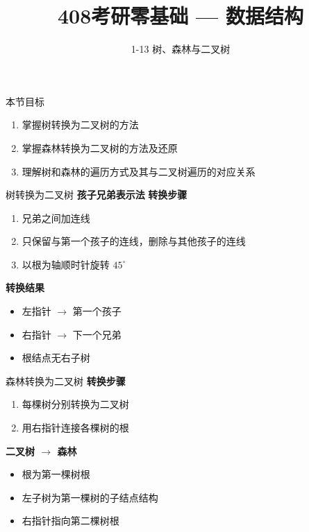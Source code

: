 \documentclass[10pt, aspectratio=169]{beamer}
\title{408考研零基础 --- 数据结构}
\subtitle{1-13 树、森林与二叉树}
\author{}
\date{}
\begin{document}
\begin{frame}{本节目标}
    \begin{enumerate}
        \item 掌握树转换为二叉树的方法
        \item 掌握森林转换为二叉树的方法及还原
        \item 理解树和森林的遍历方式及其与二叉树遍历的对应关系
    \end{enumerate}
\end{frame}

\begin{frame}{树转换为二叉树}
    \textbf{孩子兄弟表示法}
    \vspace{0.3em}
    \textbf{转换步骤}
    \begin{enumerate}
        \item 兄弟之间加连线
        \item 只保留与第一个孩子的连线，删除与其他孩子的连线
        \item 以根为轴顺时针旋转 $45^\circ$
    \end{enumerate}
    \vspace{0.3em}
    \textbf{转换结果}
    \begin{itemize}
        \item 左指针 $\to$ 第一个孩子
        \item 右指针 $\to$ 下一个兄弟
        \item 根结点无右子树
    \end{itemize}
\end{frame}

\begin{frame}{森林转换为二叉树}
    \textbf{转换步骤}
    \begin{enumerate}
        \item 每棵树分别转换为二叉树
        \item 用右指针连接各棵树的根
    \end{enumerate}
    \vspace{0.5em}
    \textbf{二叉树 $\to$ 森林}
    \begin{itemize}
        \item 根为第一棵树根
        \item 左子树为第一棵树的子结点结构
        \item 右指针指向第二棵树根
    \end{itemize}
\end{frame}
\end{document}
